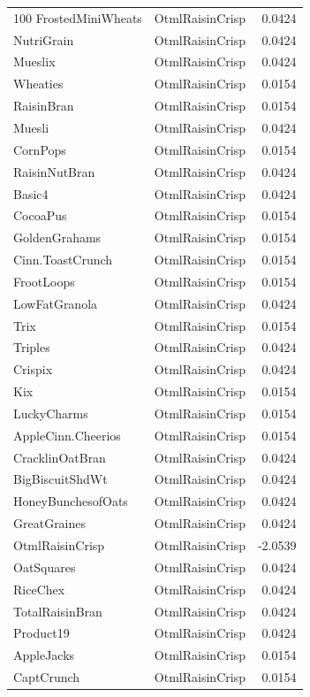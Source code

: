 \begin{longtable}{llr}
100%
FrostedMiniWheats & OtmlRaisinCrisp & 0.0424 \\
NutriGrain & OtmlRaisinCrisp & 0.0424 \\
Mueslix & OtmlRaisinCrisp & 0.0424 \\
Wheaties & OtmlRaisinCrisp & 0.0154 \\
RaisinBran & OtmlRaisinCrisp & 0.0154 \\
Muesli & OtmlRaisinCrisp & 0.0424 \\
CornPops & OtmlRaisinCrisp & 0.0154 \\
RaisinNutBran & OtmlRaisinCrisp & 0.0424 \\
Basic4 & OtmlRaisinCrisp & 0.0424 \\
CocoaPus & OtmlRaisinCrisp & 0.0154 \\
GoldenGrahams & OtmlRaisinCrisp & 0.0154 \\
Cinn.ToastCrunch & OtmlRaisinCrisp & 0.0154 \\
FrootLoops & OtmlRaisinCrisp & 0.0154 \\
LowFatGranola & OtmlRaisinCrisp & 0.0424 \\
Trix & OtmlRaisinCrisp & 0.0154 \\
Triples & OtmlRaisinCrisp & 0.0424 \\
Crispix & OtmlRaisinCrisp & 0.0424 \\
Kix & OtmlRaisinCrisp & 0.0154 \\
LuckyCharms & OtmlRaisinCrisp & 0.0154 \\
AppleCinn.Cheerios & OtmlRaisinCrisp & 0.0154 \\
CracklinOatBran & OtmlRaisinCrisp & 0.0424 \\
BigBiscuitShdWt & OtmlRaisinCrisp & 0.0424 \\
HoneyBunchesofOats & OtmlRaisinCrisp & 0.0424 \\
GreatGraines & OtmlRaisinCrisp & 0.0424 \\
OtmlRaisinCrisp & OtmlRaisinCrisp & -2.0539 \\
OatSquares & OtmlRaisinCrisp & 0.0424 \\
RiceChex & OtmlRaisinCrisp & 0.0424 \\
TotalRaisinBran & OtmlRaisinCrisp & 0.0424 \\
Product19 & OtmlRaisinCrisp & 0.0424 \\
AppleJacks & OtmlRaisinCrisp & 0.0154 \\
CaptCrunch & OtmlRaisinCrisp & 0.0154 \\

\end{longtable}
